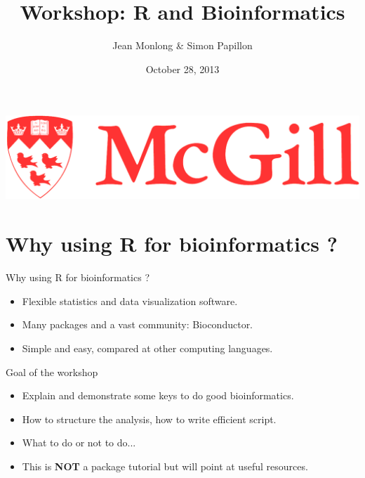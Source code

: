\documentclass[10pt]{beamer}
\title{Workshop: R and Bioinformatics}
\author{Jean Monlong \& Simon Papillon}
\institute{Human Genetics department}
\date{October 28, 2013}
\begin{document}
\begin{frame}
  \titlepage
  \centering
  \includegraphics[page=1,height=.1\textheight]{imgs/McGill-Logo1.png}

\end{frame}

\section{Why using R for bioinformatics ?}

\begin{frame}[label=handout]{Why using R for bioinformatics ?}
  \begin{itemize}
  \item Flexible statistics and data visualization software.
  \item Many packages and a vast community: Bioconductor.
  \item Simple and easy, compared at other computing languages.
  \end{itemize}
\end{frame}


\begin{frame}[label=handout]{Goal of the workshop}
  \begin{itemize}
  \item Explain and demonstrate some keys to do good bioinformatics.
  \item How to structure the analysis, how to write efficient script. 
  \item What to do or not to do...
    \bigskip
  \item This is {\bf NOT} a package tutorial but will point at useful resources.
  \end{itemize}
\end{frame}
\end{document}
